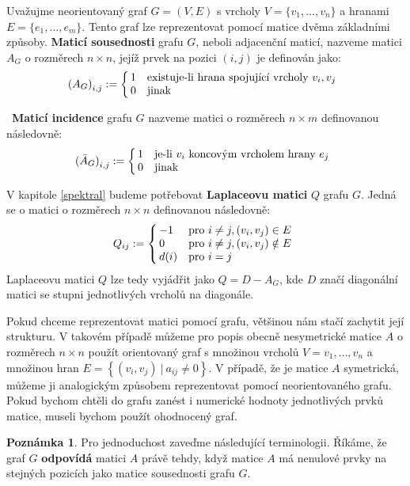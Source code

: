 \documentclass[11pt,american,czech,oneside]{book}
\theoremstyle{plain}
\theoremstyle{definition}
\newtheorem{remark}{Poznámka}
\begin{document}
Uvažujme neorientovaný graf $G=(V,E)$ s vrcholy $V = \{v_1, \ldots, v_n\}$ a hranami $E = \{e_1, \ldots, e_m\}$. Tento graf lze reprezentovat pomocí matice dvěma základními způsoby. \textbf{Maticí sousednosti} grafu $G$, neboli adjacenční maticí, nazveme matici $A_G$ o rozměrech $n \times n$, jejíž prvek na pozici $(i,j)$ je definován jako:
\[
  {(A_G)}_{i,j} :=
  \left\{
    \begin{array}{@{\,}ll}
      1  & \mbox{existuje-li hrana spojující vrcholy $v_i, v_j$} \\
      0  & \mbox{jinak}
    \end{array}
  \right.
\]

 \textbf{Maticí incidence} grafu $G$ nazveme matici o rozměrech $n \times m$  definovanou následovně:
\[
  {(\bar{A}_G)}_{i,j} :=
  \left\{
	  \begin{array}{@{\,}ll}
		  1  & \mbox{je-li $v_i$ koncovým vrcholem hrany $e_j$} \\
		  0  & \mbox{jinak}
	  \end{array}
  \right.
\]

V kapitole \ref{spektral} budeme potřebovat \textbf{Laplaceovu matici} $Q$ grafu $G$. Jedná se o matici o rozměrech $n \times n$ definovanou následovně:
\[
Q_{ij} :=
\left\{
	\begin{array}{@{\,}ll}
		-1  & \mbox{pro } i \neq j, (v_i,v_j) \in E \\
		0 & \mbox{pro } i \neq j, (v_i,v_j) \notin E\\
        d(i) & \mbox{pro } i = j
	\end{array}
\right.
\]
Laplaceovu matici $Q$ lze tedy vyjádřit jako $Q = D - A_G$, kde $D$  značí diagonální matici se stupni jednotlivých vrcholů na diagonále.

\medskip

Pokud chceme reprezentovat matici pomocí grafu, většinou nám stačí zachytit její strukturu. V takovém případě můžeme pro popis obecně nesymetrické matice $A$ o rozměrech $n \times n$ použít orientovaný graf s množinou vrcholů $V = {v_1,\ldots,v_n}$ a množinou hran $E =\left\{(v_i,v_j) \ | \ a_{ij}\neq 0\right\}$. V případě, že je matice $A$ symetrická, můžeme ji analogickým způsobem reprezentovat pomocí neorientovaného grafu.
Pokud bychom chtěli do grafu zanést i numerické hodnoty jednotlivých prvků matice, museli bychom použít ohodnocený graf.

\begin{remark}
  Pro jednoduchost zaveďme následující terminologii. Říkáme, že graf $G$ \textbf{odpovídá} matici $A$ právě tehdy, když matice $A$ má nenulové prvky na stejných pozicích jako matice sousednosti grafu $G$.
\end{remark}
\end{document}
